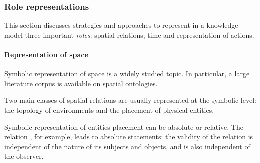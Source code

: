\subsubsection{Role representations}

This section discusses strategies and approaches to represent in a knowledge
model three important \emph{roles}: spatial relations, time and representation
of actions.

\begin{scriptsize}
\begin{center}
\end{center}
\end{scriptsize}


\paragraph{Representation of space}

Symbolic representation of space is a widely studied topic. In particular, a
large literature corpus is available on spatial ontologies.

Two main classes of spatial relations are usually represented at the symbolic
level: the topology of environments and the placement of physical entities.

\begin{scriptsize}
\begin{center}
\end{center}
\end{scriptsize}


Symbolic representation of entities placement can be absolute or relative. The
relation , for example, leads to absolute statements: the
validity of the relation is independent of the nature of its subjects and
objects, and is also independent of the observer.

